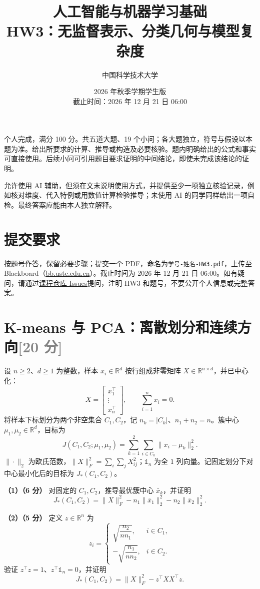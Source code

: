 \documentclass[11pt,a4paper]{article}
\title{\vspace{-1cm}\textbf{人工智能与机器学习基础\\HW3：无监督表示、分类几何与模型复杂度}}
\author{中国科学技术大学}
\date{2026 年秋季学期\quad 学生版\\[0.3em]截止时间：2026 年 12 月 21 日 06:00}
\newcommand{\R}{\mathbb R}
\newcommand{\partq}[2]{\par\Needspace{6\baselineskip}\noindent\textbf{（#1）（#2 分）}}
\begin{document}
\maketitle\thispagestyle{fancy}

个人完成，满分 100 分。共五道大题、19 个小问；各大题独立，符号与假设以本题为准。给出所要求的计算、推导或构造及必要核验。题内明确给出的公式和事实可直接使用。后续小问可引用题目要求证明的中间结论，即使未完成该结论的证明。

允许使用 AI 辅助，但须在文末说明使用方式，并提供至少一项独立核验记录，例如核对维度、代入特例或用数值计算检验推导；未使用 AI 的同学同样给出一项自检。最终答案应能由本人独立解释。

\section*{提交要求}
按题号作答，保留必要步骤；提交一个 PDF，命名为\texttt{学号-姓名-HW3.pdf}，上传至 Blackboard（\href{https://bb.ustc.edu.cn}{bb.ustc.edu.cn}）。截止时间为 2026 年 12 月 21 日 06:00。如有疑问，请通过\href{https://github.com/Intelligent114/ALML_public/issues}{课程仓库 Issues}提问，注明 HW3 和题号，不要公开个人信息或完整答案。


\section[K-means 与 PCA]{K-means 与 PCA：离散划分和连续方向\hfill\textcolor{gray}{[20 分]}}
设 $n\geq2$、$d\geq1$ 为整数，样本 $x_i\in\R^d$ 按行组成非零矩阵 $X\in\R^{n\times d}$，并已中心化：
\[
X=\begin{bmatrix}x_1^\top\\\vdots\\x_n^\top\end{bmatrix},
\qquad \sum_{i=1}^n x_i=0.
\]
将样本下标划分为两个非空集合 $C_1,C_2$，记 $n_k=|C_k|$、$n_1+n_2=n$。簇中心 $\mu_1,\mu_2\in\R^d$，目标为
\[
J(C_1,C_2;\mu_1,\mu_2)
=\sum_{k=1}^2\sum_{i\in C_k}\|x_i-\mu_k\|_2^2.
\]
$\|\cdot\|_2$ 为欧氏范数，$\|X\|_F^2=\sum_i\sum_j X_{ij}^2$；$\mathds{1}_n$ 为全 $1$ 列向量。记固定划分下对中心最小化后的目标为 $J_*(C_1,C_2)$。

\partq{1}{6} 对固定的 $C_1,C_2$，推导最优簇中心 $\bar x_k$，并证明
\[
J_*(C_1,C_2)=\|X\|_F^2-n_1\|\bar x_1\|_2^2-n_2\|\bar x_2\|_2^2.
\]

\partq{2}{5} 定义 $z\in\R^n$ 为
\[
z_i=\begin{cases}
\sqrt{\dfrac{n_2}{n n_1}},&i\in C_1,\\[0.5em]
-\sqrt{\dfrac{n_1}{n n_2}},&i\in C_2.
\end{cases}
\]
验证 $z^\top z=1$、$z^\top\mathds{1}_n=0$，并证明
\[
J_*(C_1,C_2)=\|X\|_F^2-z^\top XX^\top z.
\]
\end{document}
